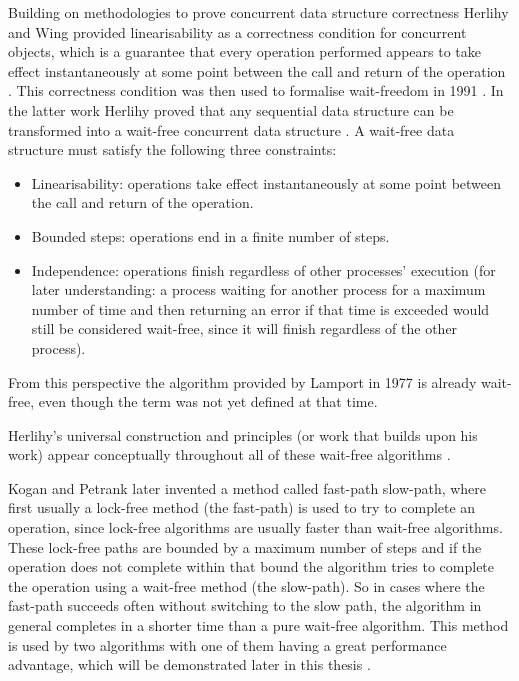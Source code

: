 Building on methodologies to prove concurrent data structure correctness Herlihy and Wing provided linearisability as a correctness condition for concurrent objects, which is a guarantee that every operation performed appears to take effect instantaneously at some point between the call and return of the operation \cite{HerlihyLinearizability}. This correctness condition was then used to formalise wait-freedom in 1991 \cite{herlihy1991wait}. In the latter work Herlihy proved that any sequential data structure can be transformed into a wait-free concurrent data structure \cite{herlihy1991wait}. A wait-free data structure must satisfy the following three constraints: 
\begin{itemize}
   \item Linearisability: operations take effect instantaneously at some point between the call and return of the operation.
   \item Bounded steps: operations end in a finite number of steps.
   \item Independence: operations finish regardless of other processes' execution (for later understanding: a process waiting for another process for a maximum number of time and then returning an error if that time is exceeded would still be considered wait-free, since it will finish regardless of the other process).
\end{itemize}
From this perspective the algorithm provided by Lamport in 1977 is already wait-free, even though the term was not yet defined at that time. \cite{herlihy1991wait,HerlihyLinearizability}

Herlihy's universal construction and principles (or work that builds upon his work) appear conceptually throughout all of these wait-free algorithms \cite{Kogan2011WaitFreeQueues,FeldmanDechev2015WaitFreeRingBuffer,kogan2012methodology,FeldmanDechevV2,FeldmanDechevV3,RamalheteQueue,wCQWaitFreeQueue,Verma2013Scalable,FastFetchAndAddWaitFreeQueue,WangCacheCoherent,adampsc,jiffy,JayantiLog,Drescher2015GuardedSections,Mateíspmc,torquati2010singleproducersingleconsumerqueuessharedcache,Aldinucci2012EfficientSync,Wang2013BQueue,MaffioneCacheAware,ffq}. \cite{herlihy1991wait}

Kogan and Petrank later invented a method called fast-path slow-path, where first usually a lock-free method (the fast-path) is used to try to complete an operation, since lock-free algorithms are usually faster than wait-free algorithms. These lock-free paths are bounded by a maximum number of steps and if the operation does not complete within that bound the algorithm tries to complete the operation using a wait-free method (the slow-path). So in cases where the fast-path succeeds often without switching to the slow path, the algorithm in general completes in a shorter time than a pure wait-free algorithm. This method is used by two algorithms with one of them having a great performance advantage, which will be demonstrated later in this thesis \cite{wCQWaitFreeQueue,FastFetchAndAddWaitFreeQueue}. \cite{kogan2012methodology}